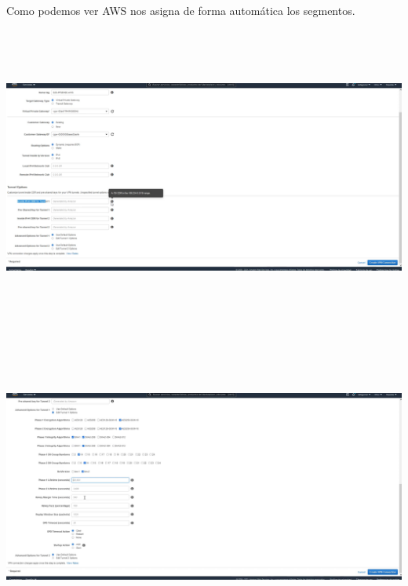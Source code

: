 \documentclass{article} %
\begin{document}
\noindent 

\noindent 

\noindent 

\noindent 

\noindent 

\noindent Como podemos ver AWS nos asigna de forma autom\'{a}tica los segmentos. 

\noindent 

\noindent \includegraphics*[width=6.73in, height=3.91in, trim=0.00in 0.10in 1.88in 0.00in]{image18}

\noindent 

\noindent 

\noindent 

\noindent \includegraphics*[width=6.56in, height=3.92in, trim=0.00in 0.16in 2.05in 0.00in]{image19}
\end{document}
